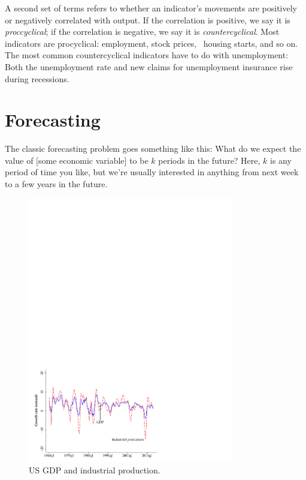 A second set of terms refers to
whether an indicator's movements
are positively or negatively correlated with output.
If the correlation is positive, we say it is {\it proccyclical\/};
if the correlation is negative, we say it is {\it countercyclical\/}.
Most indicators are procyclical:  employment, stock prices, \
housing starts, and so on.
The most common countercyclical indicators have to do with unemployment: Both the unemployment rate and new claims for unemployment insurance
 rise during recessions.

\section{Forecasting}

The classic forecasting problem goes something like this:
What do we expect the value of [some
economic variable] to be $k$ periods in the future?
Here, $k$ is any period of time you like, but
we're usually interested in anything from next week to a few years in
the future.

\begin{figure}
    \caption{US GDP and industrial production.}
    \label{fig:ip_gdp}%
    \centering
    \includegraphics[width=0.8\textwidth]{Figures/us_gdp_indprod.pdf}
\end{figure}



